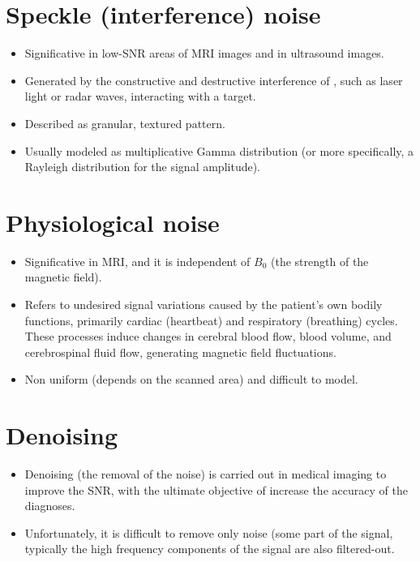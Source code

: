 \section{Speckle (interference) noise}
\begin{itemize}
\item Significative in low-SNR areas of \gls{MRI} images and in ultrasound images.
\item Generated by the constructive and destructive interference of
  , such as laser light or
  radar waves, interacting with a target.
\item Described as granular, textured pattern.
\item Usually modeled as multiplicative Gamma distribution (or more
  specifically, a Rayleigh distribution for the signal amplitude).
\end{itemize}

\section{Physiological noise}
\begin{itemize}
\item Significative in \gls{MRI}, and it is independent of $B_0$ (the
  strength of the magnetic field).
\item Refers to undesired signal variations caused by the patient's
  own bodily functions, primarily cardiac (heartbeat) and respiratory
  (breathing) cycles. These processes induce changes in cerebral blood
  flow, blood volume, and cerebrospinal fluid flow, generating
  magnetic field fluctuations.
\item Non uniform (depends on the scanned area) and difficult to model.
\end{itemize}

\section{Denoising}
\begin{itemize}
\item Denoising (the removal of the noise) is carried out in
  medical imaging to improve the \gls{SNR}, with the ultimate
  objective of increase the accuracy of the diagnoses.
\item Unfortunately, it is difficult to remove only noise (some part
  of the signal, typically the high frequency components of the signal
  are also filtered-out.
\end{itemize}

